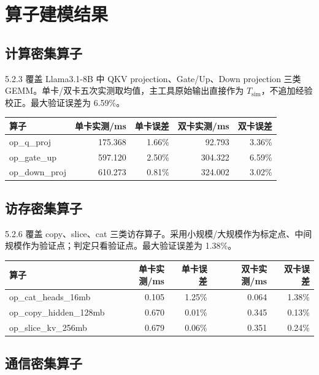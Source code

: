 \documentclass[UTF8,a4paper,11pt]{ctexart}
\begin{document}
\section{算子建模结果}

\subsection{计算密集算子}

5.2.3 覆盖 Llama3.1-8B 中 QKV projection、Gate/Up、Down projection 三类 GEMM。单卡/双卡五次实测取均值，主工具原始输出直接作为 $T_{\mathrm{sim}}$，不追加经验校正。最大验证误差为 6.59\%。

\begin{center}
\begin{tabular}{lrrrr}
\toprule
\textbf{算子} & \textbf{单卡实测/ms} & \textbf{单卡误差} & \textbf{双卡实测/ms} & \textbf{双卡误差} \\
\midrule
op\_q\_proj & 175.368 & 1.66\% & 92.793 & 3.36\% \\
op\_gate\_up & 597.120 & 2.50\% & 304.322 & 6.59\% \\
op\_down\_proj & 610.273 & 0.81\% & 324.002 & 3.02\% \\
\bottomrule
\end{tabular}
\end{center}

\subsection{访存密集算子}

5.2.6 覆盖 copy、slice、cat 三类访存算子。采用小规模/大规模作为标定点、中间规模作为验证点；判定只看验证点。最大验证误差为 1.38\%。

\begin{center}
\begin{tabular}{lrrrr}
\toprule
\textbf{算子} & \textbf{单卡实测/ms} & \textbf{单卡误差} & \textbf{双卡实测/ms} & \textbf{双卡误差} \\
\midrule
op\_cat\_heads\_16mb & 0.105 & 1.25\% & 0.064 & 1.38\% \\
op\_copy\_hidden\_128mb & 0.670 & 0.01\% & 0.345 & 0.13\% \\
op\_slice\_kv\_256mb & 0.679 & 0.06\% & 0.351 & 0.24\% \\
\bottomrule
\end{tabular}
\end{center}

\subsection{通信密集算子}
\end{document}
